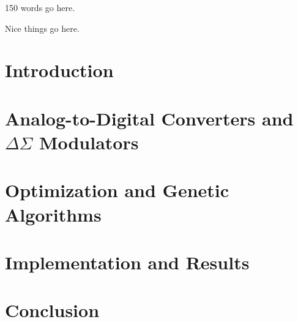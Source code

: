 \documentclass[12pt,letterpaper]{report}
\begin{document}
\mastersthesis
\renewcommand{\thesisauthor}		{Matthew Edward Jackson}
\renewcommand{\thesismonth}			{June}
\renewcommand{\thesisdefensemonth}	{June}
\renewcommand{\thesisyear}			{2009}
\renewcommand{\thesistitle}
{Optimal Design of Discrete-Time \\ Delta Sigma Modulators}
\renewcommand{\thesissupervisor}	{Peter Allen Stubberud}
\renewcommand{\thesistype}			{thesis}
\renewcommand{\thesisdegree}		{Master of Science}
\renewcommand{\thesisdedication}	{To my dog.}
\renewcommand{\thesisfrontheadsize}	{\normalsize}

\thesistitlepage
\thesiscopyrightpage
\thesissignaturepage

\newpage
{}
\begin{thesisabstract}
150 words go here.
\end{thesisabstract}

\tableofcontents
\listoffigures
\listoftables

\newpage
{} 
\begin{thesisacknowledgments}
Nice things go here.
\end{thesisacknowledgments}

\chapter{Introduction}
\label{ch:Introduction}


\chapter{Analog-to-Digital Converters and $\Delta\Sigma$ Modulators}
\label{ch:ADCs and DSMs}


\chapter{Optimization and Genetic Algorithms}
\label{ch:Optimization and Genetic Algorithms}


\chapter{Implementation and Results}
\label{ch:Implementation and Results}


\chapter{Conclusion}
\label{ch:Conclusion}


\singlespacebib



\newpage
{} 
\thesisauthorvita
\end{document}
